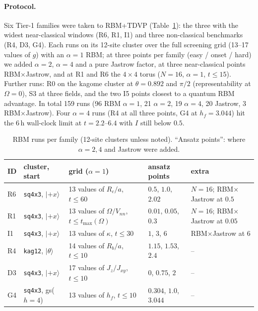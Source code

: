 \documentclass[11pt,a4paper]{article}
\newcommand{\inff}{I}
\begin{document}
\paragraph{Protocol.} Six Tier-1 families were taken to RBM+TDVP (Table~\ref{tab:rbmruns}): the three with the
widest near-classical windows (R6, R1, I1) and three non-classical benchmarks (R4, D3, G4). Each runs on its
12-site cluster over the full screening grid (13--17 values of $g$) with an $\alpha=1$ RBM; at three points per
family (easy / onset / hard) we added $\alpha=2$, $\alpha=4$ and a pure Jastrow factor, at three near-classical
points RBM$\times$Jastrow, and at R1 and R6 the $4\times4$ torus ($N=16$, $\alpha=1$, $t\le15$). Further runs: R0 on
the kagome cluster at $\theta=0.892$ and $\pi/2$ (representability at $\Omega=0$), S3 at three fields, and the two
I5 points closest to a quantum RBM advantage. In total 159 runs (96 RBM $\alpha=1$, 21 $\alpha=2$, 19 $\alpha=4$, 20
Jastrow, 3 RBM$\times$Jastrow). Four $\alpha=4$ runs (R4 at all three points, G4 at $h_f=3.044$) hit the 6\,h
wall-clock limit at $t=2.2$--$6.4$ with $\inff$ still below $0.5$.

\begin{table}[h]
  \centering
  \caption{RBM runs per family (12-site clusters unless noted). ``Ansatz points'': where $\alpha=2,4$ and Jastrow
    were added.}
  \label{tab:rbmruns}
  \footnotesize
  \begin{tabular}{lllll}
    \toprule
    ID & cluster, start & grid ($\alpha=1$) & ansatz points & extra\\
    \midrule
    R6 & \texttt{sq4x3}, $|{+}x\rangle$ & 13 values of $R_c/a$, $t\le60$ & $0.5$, $1.0$, $2.02$ & $N=16$; RBM$\times$Jastrow at $0.5$\\
    R1 & \texttt{sq4x3}, $|{+}x\rangle$ & 13 values of $\Omega/V_{nn}$, $t\le t_{\max}(\Omega)$ & $0.01$, $0.05$, $0.3$ & $N=16$; RBM$\times$Jastrow at $0.05$\\
    I1 & \texttt{sq4x3}, $|{+}x\rangle$ & 13 values of $\kappa$, $t\le30$ & $1$, $3$, $6$ & RBM$\times$Jastrow at $6$\\
    R4 & \texttt{kag12}, $|\theta\rangle$ & 14 values of $R_b/a$, $t\le10$ & $1.15$, $1.53$, $2.4$ & --\\
    D3 & \texttt{sq4x3}, $|{+}x\rangle$ & 17 values of $J_z/J_{xy}$, $t\le10$ & $0$, $0.75$, $2$ & --\\
    G4 & \texttt{sq4x3}, gs($h=4$) & 13 values of $h_f$, $t\le10$ & $0.304$, $1.0$, $3.044$ & --\\
    \bottomrule
  \end{tabular}
\end{table}
\end{document}
